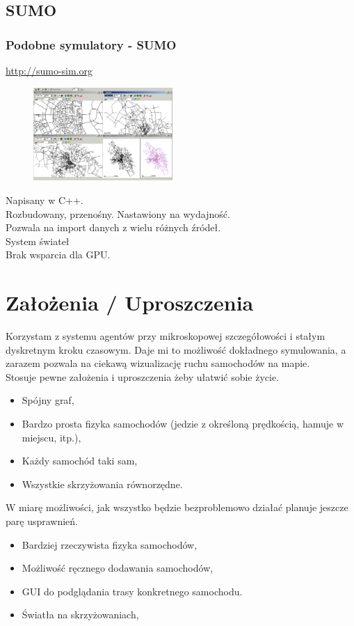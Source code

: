\documentclass[slidestop, compress, 10pt]{beamer}
\begin{document}
    \subsection{SUMO}
    \begin{frame}
        \frametitle{Podobne symulatory - SUMO}
        \url{http://sumo-sim.org} \\
        \begin{figure}
            \includegraphics[width=200px]{sumo.png}
        \end{figure}
        Napisany w C++. \\
        Rozbudowany, przenośny. Nastawiony na wydajność. \\
        Pozwala na import danych z wielu różnych źródeł. \\
        System świateł \\
        Brak wsparcia dla GPU.
    \end{frame}

\section{Założenia / Uproszczenia}
    \begin{frame}
        Korzystam z systemu agentów przy mikroskopowej szczegółowości i stałym dyskretnym kroku czasowym. Daje mi to możliwość dokładnego symulowania, a zarazem pozwala na ciekawą wizualizację ruchu samochodów na mapie.
        \pause \\
        Stosuje pewne założenia i uproszczenia żeby ułatwić sobie życie.
        \begin{itemize}
            \item Spójny graf,
            \item Bardzo prosta fizyka samochodów (jedzie z określoną prędkością, hamuje w miejscu, itp.),
            \item Każdy samochód taki sam,
            \item Wszystkie skrzyżowania równorzędne.
        \end{itemize}

        \pause
        W miarę możliwości, jak wszystko będzie bezproblemowo działać planuje jeszcze parę usprawnień.
        \begin{itemize}
            \item Bardziej rzeczywista fizyka samochodów,
            \item Możliwość ręcznego dodawania samochodów,
            \item GUI do podglądania trasy konkretnego samochodu.
            \item Światła na skrzyżowaniach,
        \end{itemize}
    \end{frame}
\end{document}
